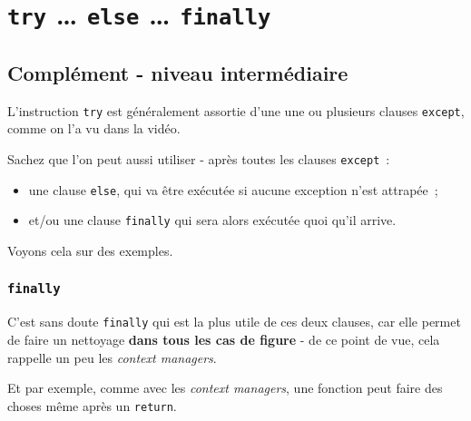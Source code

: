     
    
    
    

    

    \hypertarget{try-else-finally}{%
\section{\texorpdfstring{\texttt{try} \ldots{} \texttt{else} \ldots{}
\texttt{finally}}{try \ldots{} else \ldots{} finally}}\label{try-else-finally}}

    \hypertarget{compluxe9ment---niveau-intermuxe9diaire}{%
\subsection{Complément - niveau
intermédiaire}\label{compluxe9ment---niveau-intermuxe9diaire}}

    L'instruction \texttt{try} est généralement assortie d'une une ou
plusieurs clauses \texttt{except}, comme on l'a vu dans la vidéo.

Sachez que l'on peut aussi utiliser - après toutes les clauses
\texttt{except}~:

\begin{itemize}
\tightlist
\item
  une clause \texttt{else}, qui va être exécutée si aucune exception
  n'est attrapée~;
\item
  et/ou une clause \texttt{finally} qui sera alors exécutée quoi qu'il
  arrive.
\end{itemize}

    Voyons cela sur des exemples.

    \hypertarget{finally}{%
\subsubsection{\texorpdfstring{\texttt{finally}}{finally}}\label{finally}}

    C'est sans doute \texttt{finally} qui est la plus utile de ces deux
clauses, car elle permet de faire un nettoyage \textbf{dans tous les cas
de figure} - de ce point de vue, cela rappelle un peu les \emph{context
managers}.

Et par exemple, comme avec les \emph{context managers}, une fonction
peut faire des choses même après un \texttt{return}.

